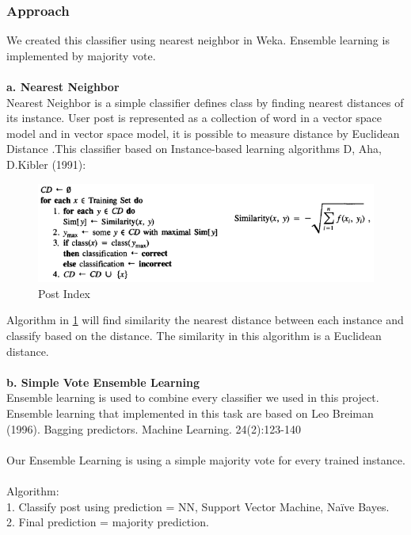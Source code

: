 \subsubsection*{Approach}
	We created this classifier using nearest neighbor in Weka. Ensemble learning is implemented by majority vote.\\\\
	\textbf{a. Nearest Neighbor} \\
		Nearest Neighbor is a simple classifier defines class by finding nearest distances of its instance. User post is represented as a collection of word in a vector space model and in vector space model, it is possible to measure distance by Euclidean Distance .This classifier based on Instance-based learning algorithms D, Aha, D.Kibler (1991): \\
	\begin{figure}[h]
		\begin{center}
			\includegraphics[scale=0.8]{images/NN1.png}
		\caption{Post Index\label{NN1}}
		\end{center}
	\end{figure}
		Algorithm in \ref{NN1} will find similarity the nearest distance between each instance and classify based on the distance. The similarity in this algorithm is a Euclidean distance.\\\\
	\textbf{b. Simple Vote Ensemble Learning} \\
		Ensemble learning is used to combine every classifier we used in this project. Ensemble learning that implemented in this task are based on Leo Breiman (1996). Bagging predictors. Machine Learning. 24(2):123-140		\\\\Our Ensemble Learning is using a simple majority vote for every trained instance.\\\\
		Algorithm:\\
		   1. Classify post using prediction = NN, Support Vector Machine, Naïve Bayes.\\
		   2. Final prediction = majority prediction.\\
